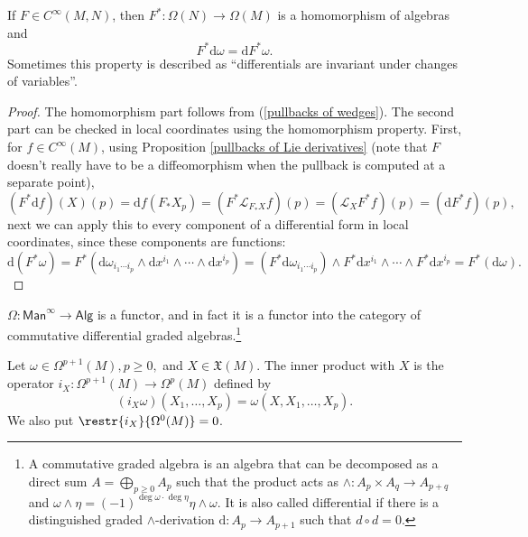 \documentclass[english,letterpaper]{article}%
\numberwithin{equation}{section}
\numberwithin{figure}{section}
\numberwithin{table}{section}
\theoremstyle{definition}
\theoremstyle{definition}
\theoremstyle{definition}
\theoremstyle{plain}
\theoremstyle{plain}
\theoremstyle{plain}
\theoremstyle{plain}
\theoremstyle{remark}
\theoremstyle{remark}
\newcommand{\dd}{{\mathrm{d}}}
\renewcommand{\geq}{\geqslant}
\newcommand{\Lie}{\mathcal{L}}
\newcommand{\fX}{\mathfrak{X}}
\begin{document}
\begin{prop}
If $F\in C^\infty(M,N)$, then $F^\ast:\Omega(N)\to\Omega(M)$ is a homomorphism of algebras and
\[F^\ast \dd\omega=\dd F^\ast\omega.\]
Sometimes this property is described as ``differentials are invariant under changes of variables''.
\end{prop}
\begin{proof}
The homomorphism part follows from (\ref{pullbacks of wedges}). The second part can be checked in local coordinates using the homomorphism property. First, for $f\in C^\infty(M)$, using Proposition \ref{pullbacks of Lie derivatives} (note that $F$ doesn't really have to be a diffeomorphism when the pullback is computed at a separate point),
\[(F^\ast \dd f)(X)(p)=\dd f(F_\ast X_p)=(F^\ast \Lie_{F_\ast X}f)(p)=(\Lie_X F^\ast f)(p)=(\dd F^\ast f)(p),\]
next we can apply this to every component of a differential form in local coordinates, since these components are functions:
\[\dd (F^\ast\omega)=F^\ast(\dd\omega_{i_1\cdots i_p}\wedge \dd x^{i_1}\wedge\cdots \wedge \dd x^{i_p})=(F^\ast\dd\omega_{i_1\cdots i_p})\wedge F^\ast \dd x^{i_1}\wedge\cdots\wedge F^\ast \dd x^{i_p}=F^\ast(\dd\omega). \]
\end{proof}
\begin{cor}
$\Omega:\mathsf{Man}^\infty \to\mathsf{Alg}$ is a functor, and in fact it is a functor into the category of commutative differential graded algebras.\footnote{A commutative graded  algebra is an algebra that can be decomposed as a direct sum $A=\bigoplus_{p\geq 0}A_p $ such that the product acts as $\wedge:A_p\times A_q\to A_{p+q}$ and $\omega\wedge\eta=(-1)^{\deg\omega\cdot\deg\eta}\eta\wedge\omega$. It is also called differential if there is a distinguished graded $\wedge$-derivation $\dd:A_p\to A_{p+1}$ such that $d\circ d=0$.}
\end{cor}

\begin{defn}
Let $\omega\in\Omega^{p+1}(M), p\geq 0,$ and $X\in\fX(M)$. The inner product with $X$ is the operator $i_X:\Omega^{p+1}(M)\to \Omega^p(M)$ defined by 
\[(i_X \omega)(X_1,\ldots,X_p)=\omega(X,X_1,\ldots,X_p).\]
We also put $\restr{i_X}{\Omega^0(M)}=0$.
\end{defn}
\end{document}
